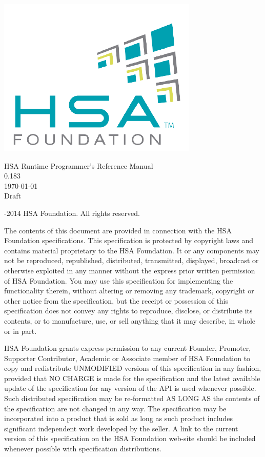 \documentclass[final]{book}
\newcommand{\doctitle}{HSA Runtime Programmer's Reference Manual}
\newcommand{\docversion}{0.183}
\begin{document}
\hypersetup{pageanchor=false,citecolor=black}
\begin{titlepage}
\includegraphics[width=.5\textwidth]{fig/foundation.png}
\vspace*{7cm}
\begin{center}
{\Large \doctitle\\[1ex]\large\docversion}\\
\vspace*{1cm}
\vspace*{0.5cm}
{\small \today}\\
\vspace*{0.5cm}
{\small Draft}\\
\end{center}
\end{titlepage}
\thispagestyle{empty} {-2014 HSA Foundation. All rights
  reserved.}


The contents of this document are provided in connection with the HSA Foundation
specifications. This specification is protected by copyright laws and contains
material proprietary to the HSA Foundation. It or any components may not be
reproduced, republished, distributed, transmitted, displayed, broadcast or
otherwise exploited in any manner without the express prior written permission
of HSA Foundation. You may use this specification for implementing the
functionality therein, without altering or removing any trademark, copyright or
other notice from the specification, but the receipt or possession of this
specification does not convey any rights to reproduce, disclose, or distribute
its contents, or to manufacture, use, or sell anything that it may describe, in
whole or in part.

HSA Foundation grants express permission to any current Founder, Promoter,
Supporter Contributor, Academic or Associate member of HSA Foundation to copy
and redistribute UNMODIFIED versions of this specification in any fashion,
provided that NO CHARGE is made for the specification and the latest available
update of the specification for any version of the API is used whenever
possible. Such distributed specification may be re-formatted AS LONG AS the
contents of the specification are not changed in any way. The specification may
be incorporated into a product that is sold as long as such product includes
significant independent work developed by the seller. A link to the current
version of this specification on the HSA Foundation web-site should be included
whenever possible with specification distributions.
\end{document}
